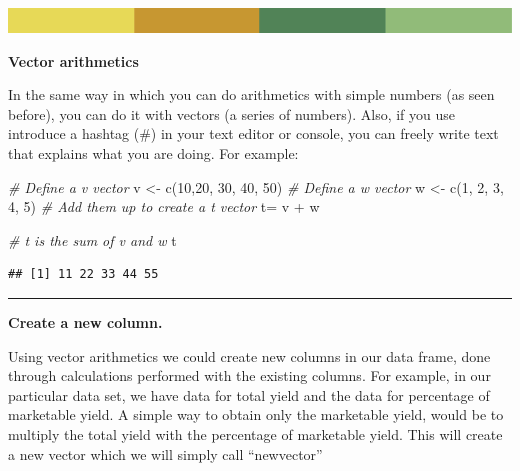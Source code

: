 \documentclass[
]{book}
\newenvironment{Shaded}{\begin{snugshade}}{\end{snugshade}}
\newcommand{\CommentTok}[1]{\textcolor[rgb]{0.56,0.35,0.01}{\textit{#1}}}
\newcommand{\DecValTok}[1]{\textcolor[rgb]{0.00,0.00,0.81}{#1}}
\newcommand{\FunctionTok}[1]{\textcolor[rgb]{0.00,0.00,0.00}{#1}}
\newcommand{\NormalTok}[1]{#1}
\newcommand{\OtherTok}[1]{\textcolor[rgb]{0.56,0.35,0.01}{#1}}
\newcommand{\SpecialCharTok}[1]{\textcolor[rgb]{0.00,0.00,0.00}{#1}}
\begin{document}
\includegraphics{rsrstrip.png}

\textbf{Vector arithmetics}

In the same way in which you can do arithmetics with simple numbers (as seen before), you can do it with vectors (a series of numbers). Also, if you use introduce a hashtag (\#) in your text editor or console, you can freely write text that explains what you are doing. For example:

\begin{Shaded}
\begin{Highlighting}[]
\CommentTok{\# Define a v vector}
\NormalTok{v }\OtherTok{\textless{}{-}} \FunctionTok{c}\NormalTok{(}\DecValTok{10}\NormalTok{,}\DecValTok{20}\NormalTok{, }\DecValTok{30}\NormalTok{, }\DecValTok{40}\NormalTok{, }\DecValTok{50}\NormalTok{)}
\CommentTok{\# Define a w vector}
\NormalTok{w }\OtherTok{\textless{}{-}} \FunctionTok{c}\NormalTok{(}\DecValTok{1}\NormalTok{, }\DecValTok{2}\NormalTok{, }\DecValTok{3}\NormalTok{, }\DecValTok{4}\NormalTok{, }\DecValTok{5}\NormalTok{)}
\CommentTok{\# Add them up to create a t vector}
\NormalTok{t}\OtherTok{=}\NormalTok{ v }\SpecialCharTok{+}\NormalTok{ w}

\CommentTok{\# t is the sum of v and w}
\NormalTok{t}
\end{Highlighting}
\end{Shaded}

\begin{verbatim}
## [1] 11 22 33 44 55
\end{verbatim}

\begin{center}\rule{0.5\linewidth}{0.5pt}\end{center}

\textbf{Create a new column. }

Using vector arithmetics we could create new columns in our data frame, done through calculations performed with the existing columns. For example, in our particular data set, we have data for total yield and the data for percentage of marketable yield. A simple way to obtain only the marketable yield, would be to multiply the total yield with the percentage of marketable yield. This will create a new vector which we will simply call ``newvector''

\begin{Shaded}
\end{Shaded}
\end{document}
